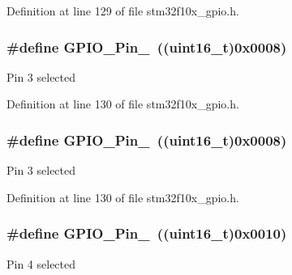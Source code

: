 Definition at line 129 of file stm32f10x\+\_\+gpio.\+h.

\subsubsection[{\texorpdfstring{G\+P\+I\+O\+\_\+\+Pin\+\_\+3}{GPIO_Pin_3}}]{\setlength{\rightskip}{0pt plus 5cm}\#define G\+P\+I\+O\+\_\+\+Pin\+\_~(({\bf uint16\+\_\+t})0x0008)}\hypertarget{group___g_p_i_o__pins__define_ga763c6544859dbe28cd3f8ad820045556}{}\label{group___g_p_i_o__pins__define_ga763c6544859dbe28cd3f8ad820045556}
Pin 3 selected 

Definition at line 130 of file stm32f10x\+\_\+gpio.\+h.

\subsubsection[{\texorpdfstring{G\+P\+I\+O\+\_\+\+Pin\+\_\+3}{GPIO_Pin_3}}]{\setlength{\rightskip}{0pt plus 5cm}\#define G\+P\+I\+O\+\_\+\+Pin\+\_~(({\bf uint16\+\_\+t})0x0008)}\hypertarget{group___g_p_i_o__pins__define_ga763c6544859dbe28cd3f8ad820045556}{}\label{group___g_p_i_o__pins__define_ga763c6544859dbe28cd3f8ad820045556}
Pin 3 selected 

Definition at line 130 of file stm32f10x\+\_\+gpio.\+h.

\subsubsection[{\texorpdfstring{G\+P\+I\+O\+\_\+\+Pin\+\_\+4}{GPIO_Pin_4}}]{\setlength{\rightskip}{0pt plus 5cm}\#define G\+P\+I\+O\+\_\+\+Pin\+\_~(({\bf uint16\+\_\+t})0x0010)}\hypertarget{group___g_p_i_o__pins__define_gacbf04d09b954606cdcc55eb2e81780e3}{}\label{group___g_p_i_o__pins__define_gacbf04d09b954606cdcc55eb2e81780e3}
Pin 4 selected 

